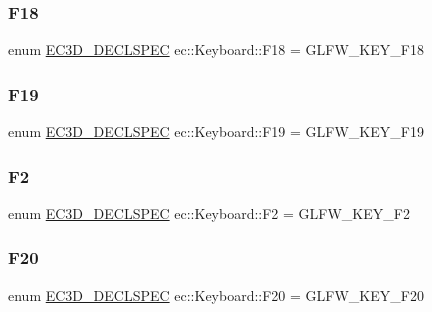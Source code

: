 \subsubsection{\texorpdfstring{F18}{F18}}
{\footnotesize\ttfamily enum \mbox{\hyperlink{_common_8h_aac42573e202ca3dd4d259c81691e2369}{E\+C3\+D\+\_\+\+D\+E\+C\+L\+S\+P\+EC}} ec\+::\+Keyboard\+::\+F18 = G\+L\+F\+W\+\_\+\+K\+E\+Y\+\_\+\+F18}

\mbox{\label{classec_1_1_keyboard_ab48cdd8c5bf4b8e47564af59678b660d}} 
\subsubsection{\texorpdfstring{F19}{F19}}
{\footnotesize\ttfamily enum \mbox{\hyperlink{_common_8h_aac42573e202ca3dd4d259c81691e2369}{E\+C3\+D\+\_\+\+D\+E\+C\+L\+S\+P\+EC}} ec\+::\+Keyboard\+::\+F19 = G\+L\+F\+W\+\_\+\+K\+E\+Y\+\_\+\+F19}

\mbox{\label{classec_1_1_keyboard_a039646ad1000430fd7bcdf04b2c91ec7}} 
\subsubsection{\texorpdfstring{F2}{F2}}
{\footnotesize\ttfamily enum \mbox{\hyperlink{_common_8h_aac42573e202ca3dd4d259c81691e2369}{E\+C3\+D\+\_\+\+D\+E\+C\+L\+S\+P\+EC}} ec\+::\+Keyboard\+::\+F2 = G\+L\+F\+W\+\_\+\+K\+E\+Y\+\_\+\+F2}

\mbox{\label{classec_1_1_keyboard_ac67a6a2b6536cd6412c3c6b9dfb841e7}} 
\subsubsection{\texorpdfstring{F20}{F20}}
{\footnotesize\ttfamily enum \mbox{\hyperlink{_common_8h_aac42573e202ca3dd4d259c81691e2369}{E\+C3\+D\+\_\+\+D\+E\+C\+L\+S\+P\+EC}} ec\+::\+Keyboard\+::\+F20 = G\+L\+F\+W\+\_\+\+K\+E\+Y\+\_\+\+F20}

\mbox{\label{classec_1_1_keyboard_aeaa9b7f0c5875f1d8c04ad36e1e86794}} 
